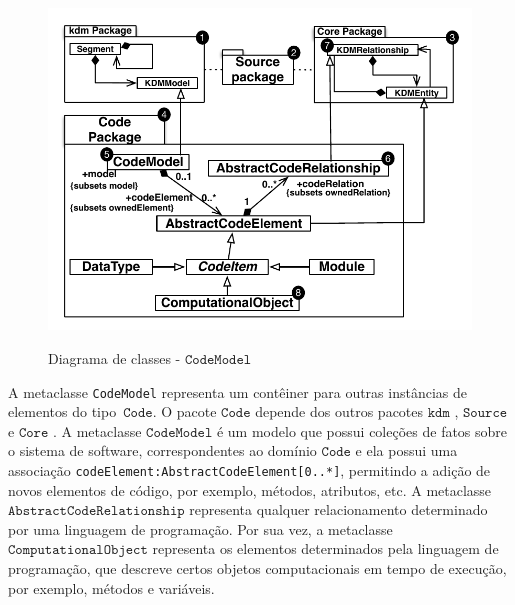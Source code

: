 \begin{figure}[!ht]
	\centering
	\caption{Diagrama de classes - $\mathtt{CodeModel}$}
	\includegraphics[scale=0.67]{images/codeModel}
	\label{fig:CodeModel}
\end{figure}

A metaclasse \texttt{CodeModel} representa um contêiner para outras instâncias de elementos do tipo~$\mathtt{Code}$. O pacote $\mathtt{Code}$  depende dos outros pacotes $\mathtt{kdm}$ , $\mathtt{Source}$  e $\mathtt{Core}$ . A metaclasse $\mathtt{CodeModel}$  é um modelo que possui coleções de fatos sobre o sistema de software, correspondentes ao domínio $\mathtt{Code}$ e ela possui uma associação \texttt{codeElement:AbstractCode\-Ele\-ment[0..*]}, permitindo a adição de novos elementos de código, por exemplo, métodos, atributos, etc. A metaclasse  $\mathtt{AbstractCodeRelationship}$  representa qualquer relacionamento determinado por uma linguagem de programação. Por sua vez, a metaclasse $\mathtt{ComputationalObject}$ representa os elementos determinados pela linguagem de programação, que descreve certos objetos computacionais em tempo de execução, por exemplo, métodos e variáveis.

